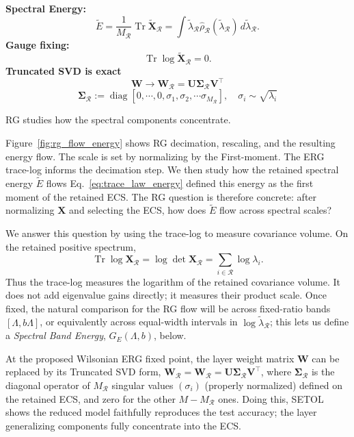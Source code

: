 \documentclass[10pt,twocolumn]{article}
\newcommand{\Tr}{\operatorname{Tr}}
\newcommand{\diag}{\operatorname{diag}}
\newcommand{\W}{\mathbf W}
\newcommand{\X}{\mathbf X}
\newcommand{\U}{\mathbf U}
\newcommand{\Vt}{\mathbf V^{\top}}
\newcommand{\Xtilde}{\widetilde{\mathbf X}}
\newcommand{\Rell}{\mathcal R}
\newcommand{\rhohat}{\widehat\rho}
\newcommand{\Mred}{M_{\Rell}}
\newcommand{\Ered}{\widetilde{E}}
\newcommand{\takeaway}[1]{%
  \par\vspace{4pt}\noindent\textcolor{boxblue}{#1}%
}
\begin{document}
\begin{tcolorbox}[marginalbox,title=\textbf{SETOL $\rightarrow$ RG energy flow}]
\small
\textbf{Spectral Energy:}
\[
\Ered=\frac{1}{\Mred}\Tr\Xtilde_{\Rell}
=\int \tilde{\lambda}_{\Rell} \rhohat_{\Rell}(\tilde{\lambda}_{\Rell})\,d\tilde{\lambda}_{\Rell} .
\]
\textbf{Gauge fixing:}
\[
\Tr\log\Xtilde_{\Rell}=0 .
\]
\textbf{Truncated SVD is exact}
\[
\W \rightarrow \W_{\Rell}=\U\mathbf{\Sigma}_{\Rell}\Vt
\]\[
\mathbf{\Sigma}_{\Rell}:=\diag[0,\cdots,0,\sigma_{1},\sigma_{2},\cdots\sigma_{M_{\Rell}}],\quad\sigma_{i}\sim\sqrt{\lambda_{i}}
\]
\takeaway{RG studies how the spectral components concentrate.}
\end{tcolorbox}

Figure~\ref{fig:rg_flow_energy} shows RG decimation, rescaling, and the resulting energy flow.
The  scale is set by normalizing by the First-moment.
The ERG trace-log informs the decimation step.
We then study how the retained spectral energy $\Ered$ flows
Eq.~\eqref{eq:trace_law_energy} defined this energy as the first moment of the retained ECS.
The RG question is therefore concrete: after normalizing $\X$ and selecting the ECS,
how does $\Ered$ flow across spectral scales?

We answer this question by using the trace-log to measure covariance volume. On the retained positive spectrum,
\begin{equation}
\Tr\log\X_{\Rell}
=
\log\det\X_{\Rell}
=
\sum_{i\in\Rell}\log\lambda_i .
\end{equation}
Thus the trace-log measures the logarithm of the retained covariance volume. It does not add eigenvalue gains directly;
it measures their product scale.
Once fixed, the natural comparison for the RG flow will be across fixed-ratio bands $[\Lambda,b\Lambda]$,
or equivalently across equal-width intervals in $\log\tilde{\lambda}_{\Rell}$;
this lets us define a \emph{Spectral Band Energy}, $G_E(\Lambda,b)$, below.

At the proposed Wilsonian ERG fixed point, the layer weight matrix $\W$ can be replaced
by its Truncated SVD form, $\W_{\Rell}=\W_{\Rell}=\U\mathbf{\Sigma}_{\Rell}\Vt$, where
$\mathbf{\Sigma}_{\Rell}$ is the diagonal operator of $M_{\Rell}$ singular values $(\sigma_{i})$
(properly normalized) defined on the retained ECS, and zero for the other  $M-M_{\Rell}$ ones.
Doing this, SETOL shows the reduced model faithfully reproduces the test accuracy;
the layer generalizing components fully concentrate into the ECS.

\end{document}
